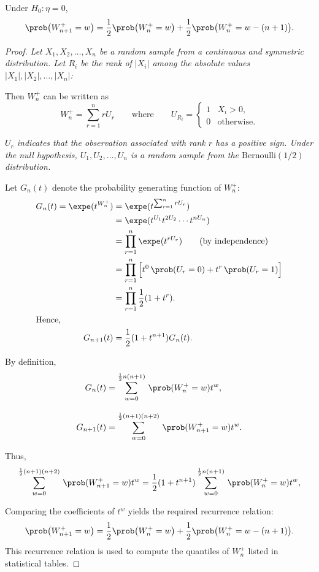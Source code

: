 
\begin{theorem}
Under $H_0:\eta=0$,
\[
\prob\big(W^{+}_{n+1}=w\big) = \frac{1}{2}\prob\big(W^{+}_n=w\big) + \frac{1}{2}\prob\big(W^{+}_n=w-(n+1)\big).
\]
\end{theorem}

\begin{proof}
\bit
\it Let $X_1,X_2,\ldots,X_n$ be a random sample from a continuous and symmetric distribution.
\it Let $R_i$ be the rank of $|X_i|$ among the absolute values $|X_1|,|X_2|,\ldots,|X_n|$:
\eit

Then $W^{+}_n$ can be written as
\[
W^{+}_n = \sum_{r=1}^n rU_r \qquad\text{where}\qquad U_{R_i} = \begin{cases} 1 & X_i > 0, \\ 0 & \text{otherwise.}\end{cases}
\]

\bit
\it $U_r$ indicates that the observation associated with rank $r$ has a positive sign.
\it Under the null hypothesis, $U_1,U_2,\ldots,U_n$ is a random sample from the $\text{Bernoulli}(1/2)$ distribution.
\eit

Let $G_n(t)$ denote the probability generating function of $W^{+}_n$:
\begin{align*}
G_n(t) 
	= \expe(t^{W^{+}_n})  
	& = \expe(t^{\sum_{r=1}^n rU_r}) \\
	& = \expe(t^{U_1}t^{2U_2}\cdots t^{nU_n}) \\
	& = \prod_{r=1}^n \expe(t^{rU_r}) \qquad\text{(by independence)} \\
	& = \prod_{r=1}^n \Big[t^0\,\prob(U_r=0) + t^r\,\prob(U_r=1)\Big] \\
	& = \prod_{r=1}^n \frac{1}{2}(1 + t^r). \\
\intertext{Hence,}
G_{n+1}(t) 
	& = \frac{1}{2}(1 + t^{n+1})G_n(t).
\end{align*}



By definition,
\begin{align*}
G_n(t)		& = \sum_{w=0}^{\frac{1}{2}n(n+1)}\,\prob(W^{+}_n=w)t^w, \\[2ex]
G_{n+1}(t)	& = \sum_{w=0}^{\frac{1}{2}(n+1)(n+2)}\,\prob(W^{+}_{n+1}=w)t^w.
\end{align*}

Thus,
\[
\sum_{w=0}^{\frac{1}{2}(n+1)(n+2)}\,\prob(W^{+}_{n+1}=w)t^w 
	= \frac{1}{2}(1+t^{n+1})\sum_{w=0}^{\frac{1}{2}n(n+1)}\,\prob(W^{+}_n=w)t^w,
\]

Comparing the coefficients of $t^w$ yields the required recurrence relation:
\[
\prob\big(W^{+}_{n+1}=w\big) = \frac{1}{2}\prob\big(W^{+}_n=w\big) + \frac{1}{2}\prob\big(W^{+}_n=w-(n+1)\big).
\]
This recurrence relation is used to compute the quantiles of $W^{+}_n$ listed in statistical tables.
\end{proof}

